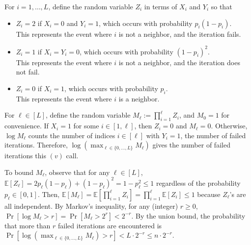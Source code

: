 For $i=1, \ldots, L$, define the random variable $Z_i$ in terms of $X_i$ and $Y_i$ so that
\begin{itemize}
\item $Z_i = 2$ if $X_i = 0$ and $Y_i = 1$, which occurs with probability $p_i(1-p_i)$. \\
This represents the event where $i$ is not a neighbor, and the iteration fails.
\item $Z_i = 1$ if $X_i = Y_i = 0$, which occurs with probability $(1-p_i)^2$.\\
 This represents the event where $i$ is not a neighbor, and the iteration does not fail.
\item $Z_i = 0$ if $X_i = 1$, which occurs with probability $p_i$. \\
This represents the event where $i$ is a neighbor.
\end{itemize}

For $\ell \in [L]$, define the random variable $M_\ell := \prod_{i=1}^\ell Z_i$, and $M_0 = 1$ for convenience. If $X_i = 1$ for some $i \in [1, \ell]$, then $Z_i = 0$ and $M_\ell = 0$. Otherwise, $\log M_\ell$ counts the number of indices $i \in [\ell]$ with $Y_i = 1$, the number of failed iterations. Therefore, $\log(\max_{\ell \in \{0, \ldots, L\}} M_\ell)$ gives the number of failed iterations this $(v)$ call.

To bound $M_\ell$, observe that for any $\ell\in[L]$, $\mathbb{E}[Z_\ell] = 2p_\ell(1-p_\ell) + (1-p_\ell)^2 = 1 - p_\ell^2 \leq 1$ regardless of the probability $p_\ell \in [0, 1]$. Then, $\mathbb{E}[M_\ell] = \mathbb{E}[\prod_{i=1}^\ell Z_i] = \prod_{i=1}^\ell \mathbb{E}[Z_i] \leq 1$ because $Z_\ell$'s are all independent. By Markov's inequality, for any (integer) $r \geq 0$, $\Pr[\log M_\ell > r] = \Pr[M_\ell > 2^r] < 2^{-r}$. By the union bound, the probability that more than $r$ failed iterations are encountered is $\Pr[\log(\max_{\ell \in \{0, \ldots, L\}} M_\ell) > r] < L\cdot 2^{-r} \leq n\cdot 2^{-r}$.

